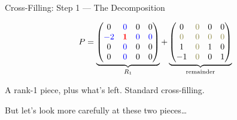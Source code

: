 \documentclass[10pt]{beamer}
\theoremstyle{definition}
\newcommand{\pvt}[1]{{\color{red}\mathbf{#1}}}       %
\newcommand{\crs}[1]{{\color{blue}#1}}                %
\newcommand{\ghost}[1]{{\color{yellow!50!black}#1}}   %
\begin{document}
\begin{frame}{Cross-Filling: Step 1 --- The Decomposition}

$$P = \underbrace{\begin{pmatrix} 0 & \crs{0} & 0 & 0 \\ \crs{-2} & \pvt{1} & \crs{0} & \crs{0} \\ 0 & \crs{0} & 0 & 0 \\ 0 & \crs{0} & 0 & 0 \end{pmatrix}}_{R_1} + \underbrace{\begin{pmatrix} 0 & \ghost{0} & 0 & 0 \\ \ghost{0} & \ghost{0} & \ghost{0} & \ghost{0} \\ 1 & \ghost{0} & 1 & 0 \\ -1 & \ghost{0} & 0 & 1 \end{pmatrix}}_{\text{remainder}}$$

\vspace{0.5em}

A rank-1 piece, plus what's left. Standard cross-filling.

\vspace{0.5em}

But let's look more carefully at these two pieces\ldots

\end{frame}
\end{document}
